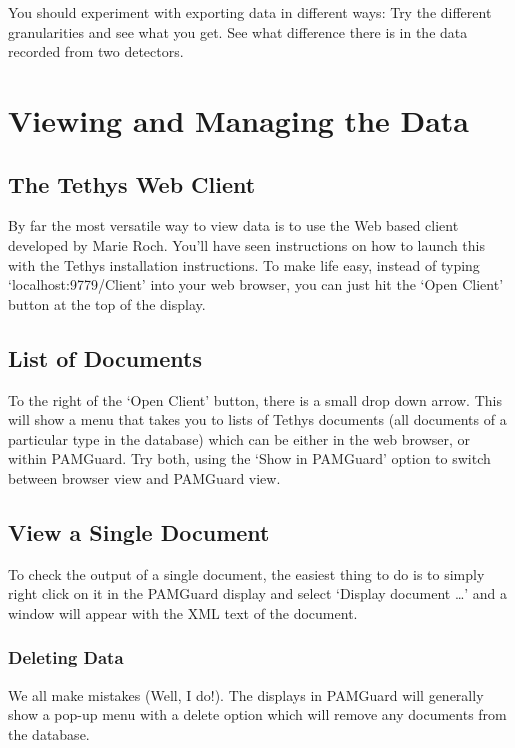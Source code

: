 \documentclass[
]{article}
\begin{document}
You should experiment with exporting data in different ways: Try the
different granularities and see what you get. See what difference there
is in the data recorded from two detectors.

\section{Viewing and Managing the Data}\label{sec-viewing}

\subsection{The Tethys Web Client}\label{the-tethys-web-client}

By far the most versatile way to view data is to use the Web based
client developed by Marie Roch. You'll have seen instructions on how to
launch this with the Tethys installation instructions. To make life
easy, instead of typing `localhost:9779/Client' into your web browser,
you can just hit the `Open Client' button at the top of the display.

\subsection{List of Documents}\label{list-of-documents}

To the right of the `Open Client' button, there is a small drop down
arrow. This will show a menu that takes you to lists of Tethys documents
(all documents of a particular type in the database) which can be either
in the web browser, or within PAMGuard. Try both, using the `Show in
PAMGuard' option to switch between browser view and PAMGuard view.

\subsection{View a Single Document}\label{view-a-single-document}

To check the output of a single document, the easiest thing to do is to
simply right click on it in the PAMGuard display and select `Display
document \ldots{}' and a window will appear with the XML text of the
document.

\subsubsection{Deleting Data}\label{deleting-data}

We all make mistakes (Well, I do!). The displays in PAMGuard will
generally show a pop-up menu with a delete option which will remove any
documents from the database.
\end{document}
